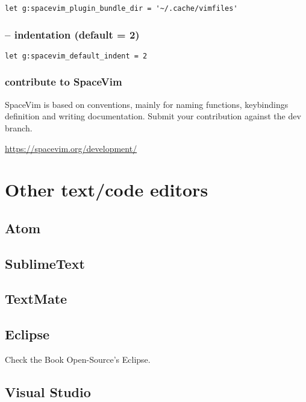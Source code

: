 \begin{verbatim}
let g:spacevim_plugin_bundle_dir = '~/.cache/vimfiles'
\end{verbatim}

\subsection{-- indentation (default = 2)}

\begin{verbatim}
let g:spacevim_default_indent = 2
\end{verbatim}

\subsection{contribute to SpaceVim}

SpaceVim is based on conventions, mainly for naming functions, keybindings
definition and writing documentation.  Submit your contribution against the dev
branch.

\url{https://spacevim.org/development/}

\chapter{Other text/code editors}

\section{Atom}
\label{sec:atom}

\section{SublimeText}
\label{sec:SublimeText}

\section{TextMate}
\label{sec:TextMate}

\section{Eclipse}
\label{sec:Eclipse}

Check the Book Open-Source's Eclipse.

\section{Visual Studio}
\label{sec:VisualStudio}

